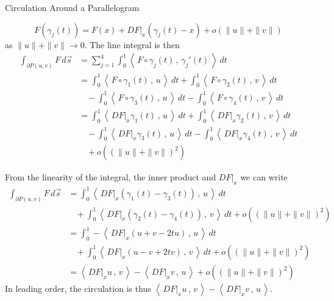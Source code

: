\documentclass[smaller,hyperref={CJKbookmarks=true}]{beamer}
\newcommand{\scp}[2]{\left\langle\,#1\,,\,#2\,\right\rangle} \newcommand{\scpp}{\langle\,\cdot\,,\,\cdot\,\rangle}
\begin{document}
\begin{frame}{Circulation Around a Parallelogram}
\begin{spacing}{1}
\[F(\gamma_j(t))=F(x)+DF|_x(\gamma_j(t)-x)+o(\|u\|+\|v\|)\]
as $\|u\|+\|v\|\to0$.
\newpage
The line integral is then
\begin{equation*}
  \begin{split}
     \int_{\partial P(u,v)}F\,d\vec{s} &=\sum_{j=1}^{4}\int_{0}^{1}\scp{F\circ\gamma_j(t)}{\gamma_j'(t)}\,dt \\
       &=\int_{0}^{1}\scp{F\circ\gamma_1(t)}{u}\,dt
       +\int_{0}^{1}\scp{F\circ\gamma_2(t)}{v}\,dt \\
       &~~~~-\int_{0}^{1}\scp{F\circ\gamma_3(t)}{u}\,dt
       -\int_{0}^{1}\scp{F\circ\gamma_4(t)}{v}\,dt \\
       &=\int_{0}^{1}\scp{DF|_x\gamma_1(t)}{u}\,dt
       +\int_{0}^{1}\scp{DF|_x\gamma_2(t)}{v}\,dt \\
       &~~~~-\int_{0}^{1}\scp{DF|_x\gamma_3(t)}{u}\,dt
       -\int_{0}^{1}\scp{DF|_x\gamma_4(t)}{v}\,dt \\
       &~~~~+o\left((\|u\|+\|v\|)^2\right)
  \end{split}
\end{equation*}
\end{spacing}
\newpage
\begin{spacing}{1}
From the linearity of the integral, the inner product and $DF|_x$ we can write
\begin{equation*}
  \begin{split}
     \int_{\partial P(u,v)}F\,d\vec{s} &=\int_{0}^{1}\scp{DF|_x(\gamma_1(t)-\gamma_3(t))}{u}\,dt \\
       &~~~~+\int_{0}^{1}\scp{DF|_x(\gamma_2(t)-\gamma_4(t))}{v}\,dt
       +o\left((\|u\|+\|v\|)^2\right) \\
       &=\int_{0}^{1}-\scp{DF|_x(u+v-2tu)}{u}\,dt \\
       &~~~~+\int_{0}^{1}\scp{DF|_x(u-v+2tv)}{v}\,dt
       +o\left((\|u\|+\|v\|)^2\right) \\
       &=\scp{DF|_xu}{v}-\scp{DF|_xv}{u}+o\left((\|u\|+\|v\|)^2\right)
  \end{split}
\end{equation*}
In leading order, the circulation is thus $\scp{DF|_xu}{v}-\scp{DF|_xv}{u}$.
\end{spacing}
\end{frame}
\end{document}
